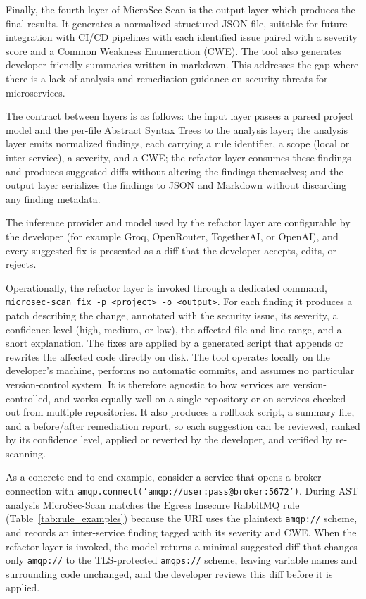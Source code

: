 \documentclass[preprint,12pt]{elsarticle}
\newcommand{\new}[1]{#1}
\begin{document}
Finally, the fourth layer of MicroSec-Scan is the output layer which produces the final results. It generates a normalized structured JSON file, suitable for future integration with CI/CD pipelines with each identified issue \new{paired} with a severity score and a Common Weakness Enumeration (CWE). The tool also generates developer-friendly summaries written in markdown. This addresses the gap where there is a lack of analysis and remediation guidance on security threats for microservices. 

\new{The contract between layers is as follows: the input layer passes a parsed project model and the per-file Abstract Syntax Trees to the analysis layer; the analysis layer emits normalized findings, each carrying a rule identifier, a scope (local or inter-service), a severity, and a CWE; the refactor layer consumes these findings and produces suggested diffs without altering the findings themselves; and the output layer serializes the findings to JSON and Markdown without discarding any finding metadata.}

\new{The inference provider and model used by the refactor layer are configurable by the developer (for example Groq, OpenRouter, TogetherAI, or OpenAI), and every suggested fix is presented as a diff that the developer accepts, edits, or rejects.}

\new{Operationally, the refactor layer is invoked through a dedicated command, \texttt{microsec-scan fix -p <project> -o <output>}. For each finding it produces a patch describing the change, annotated with the security issue, its severity, a confidence level (high, medium, or low), the affected file and line range, and a short explanation. The fixes are applied by a generated script that appends or rewrites the affected code directly on disk. The tool operates locally on the developer's machine, performs no automatic commits, and assumes no particular version-control system. It is therefore agnostic to how services are version-controlled, and works equally well on a single repository or on services checked out from multiple repositories. It also produces a rollback script, a summary file, and a before/after remediation report, so each suggestion can be reviewed, ranked by its confidence level, applied or reverted by the developer, and verified by re-scanning.}

\new{As a concrete end-to-end example, consider a service that opens a broker connection with \texttt{amqp.connect('amqp://user:pass@broker:5672')}. During AST analysis MicroSec-Scan matches the Egress Insecure RabbitMQ rule (Table~\ref{tab:rule_examples}) because the URI uses the plaintext \texttt{amqp://} scheme, and records an inter-service finding tagged with its severity and CWE. When the refactor layer is invoked, the model returns a minimal suggested diff that changes only \texttt{amqp://} to the TLS-protected \texttt{amqps://} scheme, leaving variable names and surrounding code unchanged, and the developer reviews this diff before it is applied.} 
\end{document}
